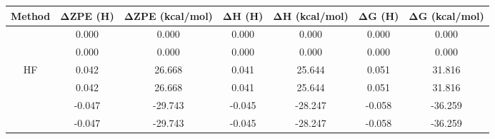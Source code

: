 \begin{tabular}{|c| c |c | c | c | c | c |}
    \hline
    \multicolumn{1}{|c|}{\textbf{Method}} &   \textbf{ΔZPE (H)}           &   \textbf{ΔZPE (kcal/mol)} &   \textbf{ΔH (H)}             &  \textbf{ΔH (kcal/mol)} & \textbf{ΔG (H)}                                  & \textbf{ΔG (kcal/mol)} \\ \hline
                                                                                   & 0.000                                            & 0.000                                        & 0.000                                            & 0.000                                      & 0.000                                            & 0.000                  \\ \hline
                                                                                   & 0.000                                            & 0.000                                        & 0.000                                            & 0.000                                      & 0.000                                            & 0.000                  \\ \hline
    \multicolumn{1}{|c|}{ HF}                                  & 0.042                                            & 26.668                                       & 0.041                                            & 25.644                                     & 0.051                                            & 31.816                 \\ \hline
                                                                                   & 0.042                                            & 26.668                                       & 0.041                                            & 25.644                                     & 0.051                                            & 31.816                 \\ \hline
                                                                                   & -0.047                                           & -29.743                                      & -0.045                                           & -28.247                                    & -0.058                                           & -36.259                \\ \hline
                                                                                   & -0.047                                           & -29.743                                      & -0.045                                           & -28.247                                    & -0.058                                           & -36.259                \\ \hline

\end{tabular}

